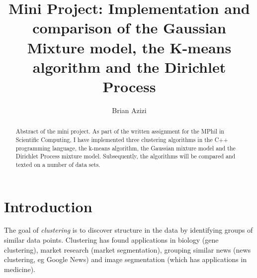 \documentclass[final,3p,times,twocolumn]{elsarticle}
\begin{document}
\begin{frontmatter}



\title{Mini Project: Implementation and comparison of the Gaussian Mixture model, the K-means algorithm and the Dirichlet Process}


\author{Brian Azizi}

\address{Cavendish Laboratory, Department of Physics, J J Thomson
  Avenue, Cambridge. CB3 0HE}

\begin{abstract}
Abstract of the mini project. As part of the written assignment for the MPhil in Scientific Computing, I have implemented three clustering algorithms in the C++ programming language, the k-means algorithm, the Gaussian mixture model and the Dirichlet Process mixture model. Subsequently, the algorithms will be compared and texted on a number of data sets.
\end{abstract}

\end{frontmatter}


\section{Introduction}
\label{sect:Intro}
The goal of \emph{clustering} is to discover structure in the data by identifying groups of similar data points. 
Clustering has found applications in biology (gene clustering), market research (market segmentation), grouping similar news (news clustering, eg Google News) and image segmentation (which has applications in medicine).
\end{document}
